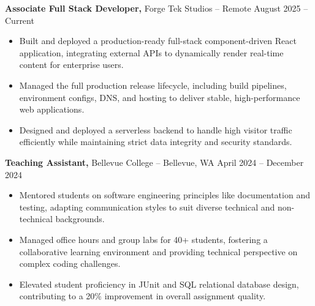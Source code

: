 \documentclass[11pt]{article}       %
\begin{document}
\textbf{Associate Full Stack Developer,} {Forge Tek Studios} -- Remote \hfill August 2025 -- Current 
\vspace{-9pt}
\begin{itemize}
  \item Built and deployed a production-ready full-stack component-driven React application, integrating external APIs to dynamically render real-time content for enterprise users.
  \item Managed the full production release lifecycle, including build pipelines, environment configs, DNS, and hosting to deliver stable, high-performance web applications.
  \item Designed and deployed a serverless backend to handle high visitor traffic efficiently while maintaining strict data integrity and security standards.
\end{itemize}

\textbf{Teaching Assistant,} {Bellevue College} -- Bellevue, WA \hfill April 2024 -- December 2024 \\
\vspace{-9pt}
\begin{itemize}
  \item Mentored students on software engineering principles like documentation and testing, adapting communication styles to suit diverse technical and non-technical backgrounds.
  \item Managed office hours and group labs for 40+ students, fostering a collaborative learning environment and providing technical perspective on complex coding challenges.
  \item Elevated student proficiency in JUnit and SQL relational database design, contributing to a 20\% improvement in overall assignment quality.
\end{itemize}

\end{document}
